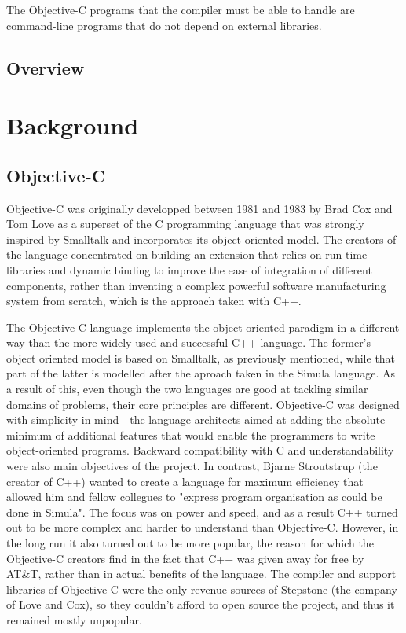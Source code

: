 \documentclass[parskip]{cs4rep}
\begin{document}
The Objective-C programs that the compiler must be able to handle are command-line programs that do not depend on external libraries.

\section{Overview}

\chapter{Background}

\section{Objective-C}

Objective-C was originally developped between 1981 and 1983 by Brad Cox and Tom Love as a superset of the C programming language that was strongly inspired by Smalltalk and incorporates its object oriented model\cite{Biancuzzi2009}. The creators of the language concentrated on building an extension that relies on run-time libraries and dynamic binding to improve the ease of integration of different components, rather than inventing a complex powerful software manufacturing system from scratch, which is the approach taken with C++.

The Objective-C language implements the object-oriented paradigm in a different way than the more widely used and successful C++ language. The former's object oriented model is based on Smalltalk, as previously mentioned, while that part of the latter is modelled after the aproach taken in the Simula language. As a result of this, even though the two languages are good at tackling similar domains of problems, their core principles are different. Objective-C was designed with simplicity in mind - the language architects aimed at adding the absolute minimum of additional features that would enable the programmers to write object-oriented programs. Backward compatibility with C and understandability were also main objectives of the project. In contrast, Bjarne Stroutstrup (the creator of C++) wanted to create a language for maximum efficiency that allowed him and fellow collegues to "express program organisation as could be done in Simula"\cite{Biancuzzi2009}. The focus was on power and speed, and as a result C++ turned out to be more complex and harder to understand than Objective-C. However, in the long run it also turned out to be more popular, the reason for which the Objective-C creators find in the fact that C++ was given away for free by AT\&T, rather than in actual benefits of the language. The compiler and support libraries of Objective-C were the only revenue sources of Stepstone (the company of Love and Cox), so they couldn't afford to open source the project, and thus it remained mostly unpopular.
\end{document}
